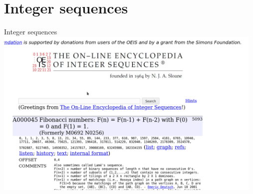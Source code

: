 \documentclass[t,usenames,dvipsnames]{beamer} %
\newcommand{\1}{\boldsymbol{1}}
\newcommand{\0}{\boldsymbol{0}}
\newcommand{\Nom}{\mathbb{N}_0^m}
\newcommand{\Z}{\boldsymbol{Z}}
\renewcommand{\r}{\boldsymbol{r}}
\begin{document}










\section{Integer sequences}

\begin{frame}{Integer sequences}
    \label{oeis}
\includegraphics[width=13cm]{zoeis-c.png}
\end{frame}
\end{document}
